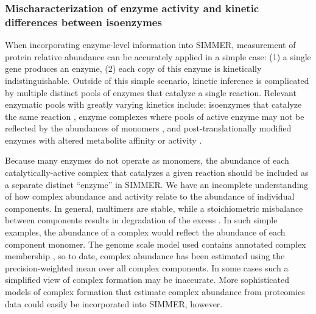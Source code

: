 \subsubsection{Mischaracterization of enzyme activity and kinetic differences between isoenzymes}

When incorporating enzyme-level information into SIMMER, measurement of protein relative abundance can be accurately applied in a simple case: (1) a single gene produces an enzyme, (2) each copy of this enzyme is kinetically indistinguishable. Outside of this simple scenario, kinetic inference is complicated by multiple distinct pools of enzymes that catalyze a single reaction. Relevant enzymatic pools with greatly varying kinetics include: isoenzymes that catalyze the same reaction \cite{Wilson:2003cb}, enzyme complexes where pools of active enzyme may not be reflected by the abundances of monomers \cite{Cohen:2000bj}, and post-translationally modified enzymes with altered metabolite affinity or activity \cite{Cohen:2000bj, Schulz:2014eo}. 

Because many enzymes do not operate as monomers, the abundance of each catalytically-active complex that catalyzes a given reaction should be included as a separate distinct ``enzyme'' in SIMMER. We have an incomplete understanding of how complex abundance and activity relate to the abundance of individual components. In general, multimers are stable, while a stoichiometric misbalance between components results in degradation of the excess \cite{Marianayagam:2004ie}. In such simple examples, the abundance of a complex would reflect the abundance of each component monomer.  The genome scale model used contains annotated complex membership \cite{BenjaminDHeavner:2013bp}, so to date, complex abundance has been estimated using the precision-weighted mean over all complex components. In some cases such a simplified view of complex formation may be inaccurate.  More sophisticated models of complex formation that estimate complex abundance from proteomics data could easily be incorporated into SIMMER, however.
 
